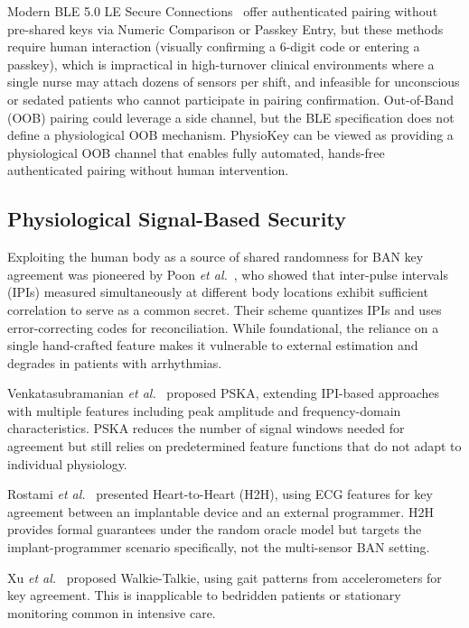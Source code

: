 \documentclass[sensors,article,submit,pdftex,moreauthors]{Definitions/mdpi}
\newcommand{\etal}{\textit{et al.}}
\begin{document}
Modern BLE 5.0 LE Secure Connections~\cite{bluetooth2023core} offer authenticated pairing without pre-shared keys via Numeric Comparison or Passkey Entry, but these methods require human interaction (visually confirming a 6-digit code or entering a passkey), which is impractical in high-turnover clinical environments where a single nurse may attach dozens of sensors per shift, and infeasible for unconscious or sedated patients who cannot participate in pairing confirmation. Out-of-Band (OOB) pairing could leverage a side channel, but the BLE specification does not define a physiological OOB mechanism. PhysioKey can be viewed as providing a physiological OOB channel that enables fully automated, hands-free authenticated pairing without human intervention.

\subsection{Physiological Signal-Based Security}
\label{subsec:physio_security}

Exploiting the human body as a source of shared randomness for BAN key agreement was pioneered by Poon \etal~\cite{poon2006novel}, who showed that inter-pulse intervals (IPIs) measured simultaneously at different body locations exhibit sufficient correlation to serve as a common secret. Their scheme quantizes IPIs and uses error-correcting codes for reconciliation. While foundational, the reliance on a single hand-crafted feature makes it vulnerable to external estimation and degrades in patients with arrhythmias.

Venkatasubramanian \etal~\cite{venkatasubramanian2010pska} proposed PSKA, extending IPI-based approaches with multiple features including peak amplitude and frequency-domain characteristics. PSKA reduces the number of signal windows needed for agreement but still relies on predetermined feature functions that do not adapt to individual physiology.

Rostami \etal~\cite{rostami2013heart} presented Heart-to-Heart (H2H), using ECG features for key agreement between an implantable device and an external programmer. H2H provides formal guarantees under the random oracle model but targets the implant-programmer scenario specifically, not the multi-sensor BAN setting.

Xu \etal~\cite{xu2017walkie} proposed Walkie-Talkie, using gait patterns from accelerometers for key agreement. This is inapplicable to bedridden patients or stationary monitoring common in intensive care.
\end{document}
